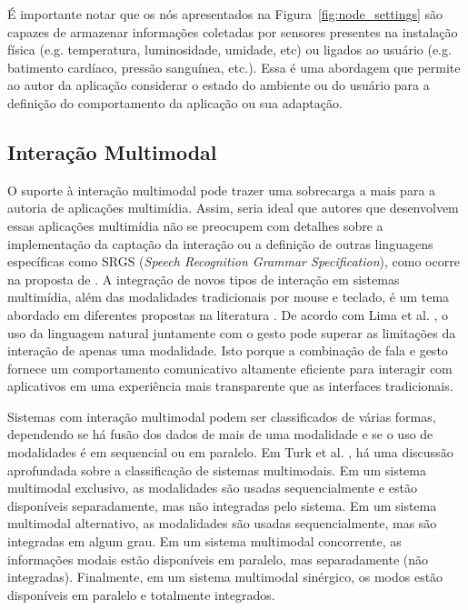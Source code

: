É importante notar que os nós apresentados na Figura~\ref{fig:node_settings} são capazes de armazenar informações coletadas por sensores presentes na instalação física (e.g. temperatura, luminosidade, umidade, etc) ou ligados ao usuário (e.g. batimento cardíaco, pressão sanguínea, etc.). Essa é uma abordagem que permite ao autor da aplicação considerar o estado do ambiente ou do usuário para a definição do comportamento da aplicação ou sua adaptação.

\subsection{Interação Multimodal}
\label{sec:MulModal}

O suporte à interação multimodal pode trazer uma sobrecarga a mais para a autoria de aplicações multimídia. Assim, seria ideal que autores que desenvolvem essas aplicações multimídia não se preocupem com detalhes sobre a implementação da captação da interação ou a definição de outras linguagens específicas como SRGS (\textit{Speech Recognition Grammar Specification}), como ocorre na proposta de \cite{Guedes:2016aa}. A integração de novos tipos de interação em sistemas multimídia, além das modalidades tradicionais por mouse e teclado, é um tema abordado em diferentes propostas na literatura \cite{de2011multimodal,nery2008desenvolvimento, batista2010estendendo}. De acordo com Lima et al. \cite{de2011multimodal}, o uso da linguagem natural juntamente com o gesto pode superar as limitações da interação de apenas uma modalidade. Isto porque a combinação de fala e gesto fornece um comportamento comunicativo altamente eficiente para interagir com aplicativos em uma experiência mais transparente que as interfaces tradicionais. 

Sistemas com interação multimodal podem ser classificados de várias formas, dependendo se há fusão dos dados de mais de uma modalidade e se o uso de modalidades é em sequencial ou em paralelo. Em Turk et al. \cite{turk2014multimodal}, há uma discussão aprofundada sobre a classificação de sistemas multimodais. Em um sistema multimodal exclusivo, as modalidades são usadas sequencialmente e estão disponíveis separadamente, mas não integradas pelo sistema. Em um sistema multimodal alternativo, as modalidades são usadas sequencialmente, mas são integradas em algum grau. Em um sistema multimodal concorrente, as informações modais estão disponíveis em paralelo, mas separadamente (não integradas). Finalmente, em um sistema multimodal sinérgico, os modos estão disponíveis em paralelo e totalmente integrados. 

